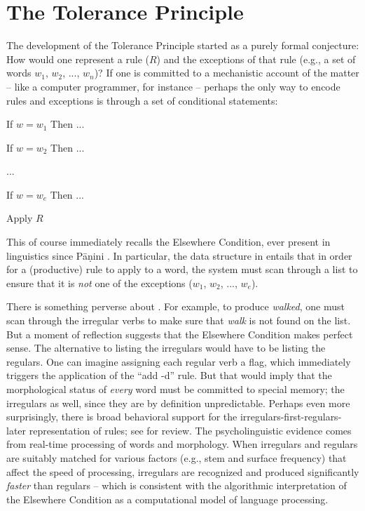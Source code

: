 \documentclass[output=paper,
modfonts
]{LSP/langsci}
\begin{document}
\section{The Tolerance Principle}
The development of the Tolerance Principle started as a purely formal
conjecture: How 
would one represent a rule ($R$) and the
exceptions of that rule (e.g., a set of words $w_1$, $w_2$, ...,
$w_n$)? If one is committed to a mechanistic account of the
matter -- like a computer programmer, for instance -- perhaps
the only way to encode rules and exceptions is 
through a set of conditional statements: 
\begin{exe}\label{elsewhere} \ex

{ If} $w=w_1$ { Then} ...

{ If} $w=w_2$ { Then} ...

...

{ If} $w=w_e$ { Then} ...

Apply $R$

\end{exe}
\noindent This of course immediately recalls the Elsewhere Condition,
ever present in linguistics since P{\={a}}\d{n}ini
\citep{Anderson1969,  Aronoff1976, Kiparsky1973b, Halle1993}.
In particular,  the data structure in  entails that in
 order for a (productive) rule to apply to a word, the system must
 scan through a list  to ensure that it is \textit{not} one of the
 exceptions ($w_1$, $w_2$, ...,
$w_e$).

There is something perverse about . For
example, to produce \textit{walked}, one  must scan through the irregular
verbs to make sure that \textit{walk} is not found on the list. But a
moment of reflection suggests that the Elsewhere Condition makes perfect
sense. The alternative to listing the irregulars would have to be
listing the regulars. One can imagine assigning each regular verb a
flag,  which immediately triggers the application of the ``add -d'' rule. But
that would imply that the morphological status of  \textit{every} word
 must be committed to special memory;  the irregulars as well, since
 they are by  definition  unpredictable.  Perhaps even more
 surprisingly, there is broad 
 behavioral  support for  the 
irregulars-first-regulars-later representation of rules; see
\citealt[][Chapter 3]{POP} for review. The psycholinguistic evidence
comes from real-time processing of words and morphology. When 
irregulars and regulars are suitably matched for various factors
(e.g., stem and surface frequency) that affect the speed of
processing, irregulars are recognized and produced significantly \emph{faster} than regulars -- which is consistent with the 
algorithmic interpretation of the Elsewhere Condition as a
computational model of 
language processing. 
\end{document}
